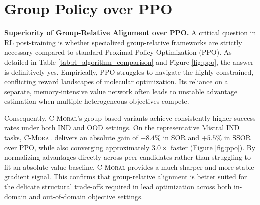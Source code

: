 \documentclass[11pt]{article}
\begin{document}
\section{Group Policy over PPO}
\label{appendix:ppo}

\textbf{Superiority of Group-Relative Alignment over PPO.}
A critical question in RL post-training is whether specialized group-relative frameworks are strictly necessary compared to standard Proximal Policy Optimization (PPO). As detailed in Table \ref{tab:rl_algorithm_comparison} and Figure \ref{fig:ppo}, the answer is definitively yes. Empirically, PPO struggles to navigate the highly constrained, conflicting reward landscapes of molecular optimization. Its reliance on a separate, memory-intensive value network often leads to unstable advantage estimation when multiple heterogeneous objectives compete.

Consequently, \textsc{C-Moral}'s group-based variants achieve consistently higher success rates under both IND and OOD settings. On the representative Mistral IND tasks, \textsc{C-Moral} delivers an absolute gain of $+8.4\%$ in SOR and $+5.5\%$ in SSOR over PPO, while also converging approximately $3.0\times$ faster (Figure \ref{fig:ppo}). By normalizing advantages directly across peer candidates rather than struggling to fit an absolute value baseline, \textsc{C-Moral} provides a much sharper and more stable gradient signal. This confirms that group-relative alignment is better suited for the delicate structural trade-offs required in lead optimization across both in-domain and out-of-domain objective settings.
\end{document}
